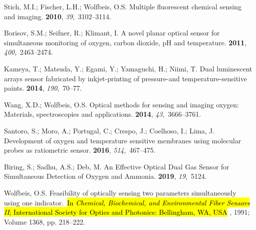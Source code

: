 \documentclass[sensors,article,accept,moreauthors,pdftex,10pt,a4paper]{Definitions/mdpi}
\begin{document}
\begin{thebibliography}{999}
\providecommand{\natexlab}[1]{#1}

Stich, M.I.; Fischer, L.H.; Wolfbeis, O.S.
\newblock Multiple fluorescent chemical sensing and imaging.
 {\bf 2010}, {\em 39},~3102--3114.

Borisov, S.M.; Seifner, R.; Klimant, I.
\newblock A novel planar optical sensor for simultaneous monitoring of oxygen,
  carbon dioxide, pH and temperature.
 {\bf 2011}, {\em
  400},~2463--2474.

Kameya, T.; Matsuda, Y.; Egami, Y.; Yamaguchi, H.; Niimi, T.
\newblock Dual luminescent arrays sensor fabricated by inkjet-printing of
  pressure-and temperature-sensitive paints.
 {\bf 2014}, {\em
  190},~70--77.

Wang, X.D.; Wolfbeis, O.S.
\newblock Optical methods for sensing and imaging oxygen: Materials,
  spectroscopies and applications.
 {\bf 2014}, {\em 43},~3666--3761.

Santoro, S.; Moro, A.; Portugal, C.; Crespo, J.; Coelhoso, I.; Lima, J.
\newblock Development of oxygen and temperature sensitive membranes using
  molecular probes as ratiometric sensor.
 {\bf 2016}, {\em 514},~467--475.

Biring, S.; Sadhu, A.S.; Deb, M.
\newblock An Effective Optical Dual Gas Sensor for Simultaneous Detection of
  Oxygen and Ammonia.
 {\bf 2019}, {\em 19},~5124.

Wolfbeis, O.S.
\newblock Feasibility of optically sensing two parameters simultaneously using
  one indicator.~\newblock  \hl{In \emph{Chemical, Biochemical, and Environmental Fiber Sensors II}; International Society for Optics and Photonics: Bellingham, WA, USA} %
, 1991; Volume 1368, pp. 218--222.


\end{thebibliography}
\end{document}
